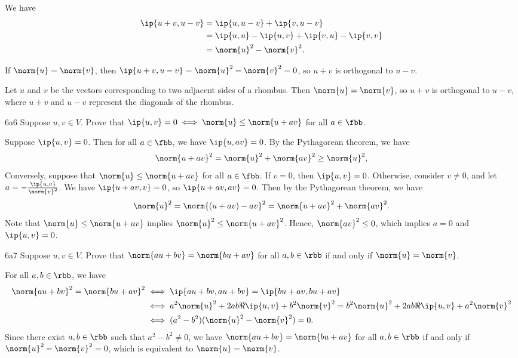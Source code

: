 \begin{solenum}
    \item We have
    \begin{align*}
        \ip{u + v, u - v} &= \ip{u, u - v} + \ip{v, u - v} \\
        &= \ip{u, u} - \ip{u, v} + \ip{v, u} - \ip{v, v} \\
        &= \norm{u}^2 - \norm{v}^2.
    \end{align*}
    \item If $\norm{u} = \norm{v}$, then $\ip{u + v, u - v} = \norm{u}^2 - \norm{v}^2 = 0$, so $u + v$ is orthogonal to $u - v$.
    \item Let $u$ and $v$ be the vectors corresponding to two adjacent sides of a rhombus.
    Then $\norm{u} = \norm{v}$, so $u + v$ is orthogonal to $u - v$, where $u + v$ and $u - v$ represent the diagonals of the rhombus.
\end{solenum}

\begin{exercise}{6a6}
    Suppose $u, v \in V$.
    Prove that $\ip{u, v} = 0 \iff \norm{u} \leq \norm{u + av}$ for all $a \in \fbb$.
\end{exercise}

\begin{sol}
    Suppose $\ip{u, v} = 0$.
    Then for all $a \in \fbb$, we have $\ip{u, av} = 0$.
    By the Pythagorean theorem, we have
    \[
        \norm{u + av}^2 = \norm{u}^2 + \norm{av}^2 \geq \norm{u}^2,
    \]
    Conversely, suppose that $\norm{u} \leq \norm{u + av}$ for all $a \in \fbb$.
    If $v = 0$, then $\ip{u, v} = 0$.
    Otherwise, consider $v \neq 0$, and let $a = -\frac{\ip{u, v}}{\norm{v}^2}$.
    We have $\ip{u + av, v} = 0$, so $\ip{u + av, av} = 0$.
    Then by the Pythagorean theorem, we have
    \[
        \norm{u}^2 = \norm{(u + av) - av}^2 = \norm{u + av}^2 + \norm{av}^2.
    \]
    Note that $\norm{u} \leq \norm{u + av}$ implies $\norm{u}^2 \leq \norm{u + av}^2$.
    Hence, $\norm{av}^2 \leq 0$, which implies $a = 0$ and $\ip{u, v} = 0$.
\end{sol}

\begin{exercise}{6a7}
    Suppose $u, v \in V$.
    Prove that $\norm{au + bv} = \norm{bu + av}$ for all $a, b \in \rbb$ if and only if $\norm{u} = \norm{v}$.
\end{exercise}

\begin{sol}
    For all $a, b \in \rbb$, we have
    \begin{align*}
        \norm{au + bv}^2 = \norm{bu + av}^2 &\iff \ip{au + bv, au + bv} = \ip{bu + av, bu + av} \\
        &\iff a^2\norm{u}^2 + 2ab\Re\ip{u, v} + b^2\norm{v}^2 = b^2\norm{u}^2 + 2ab\Re\ip{u, v} + a^2\norm{v}^2 \\
        &\iff (a^2 - b^2)(\norm{u}^2 - \norm{v}^2) = 0.
    \end{align*}
    Since there exist $a, b \in \rbb$ such that $a^2 - b^2 \neq 0$, we have $\norm{au + bv} = \norm{bu + av}$ for all $a, b \in \rbb$ if and only if $\norm{u}^2 - \norm{v}^2 = 0$, which is equivalent to $\norm{u} = \norm{v}$.
\end{sol}

